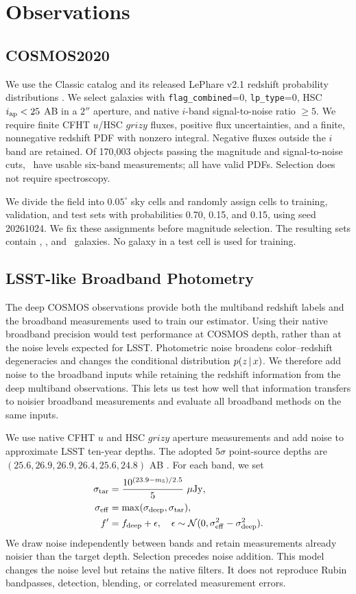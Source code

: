 \section{Observations}\label{sec:observations}
\subsection{COSMOS2020}
We use the \cosmos Classic catalog and its released LePhare v2.1 redshift
probability distributions \citep{weaver2022,ilbert2006}. We select galaxies
with \texttt{flag\_combined}=0, \texttt{lp\_type}=0, HSC $i_{\rm ap}<25$ AB
in a $2''$ aperture, and native $i$-band signal-to-noise ratio $\geq5$.
We require finite CFHT $u$/HSC $grizy$ fluxes, positive flux uncertainties,
and a finite, nonnegative redshift PDF with nonzero integral. Negative fluxes
outside the $i$ band are retained. Of 170,003 objects passing the magnitude
and signal-to-noise cuts, \NParent\ have usable six-band measurements;
all have valid PDFs. Selection does not require spectroscopy.

We divide the field into $0.05^\circ$ sky cells and randomly assign cells
to training, validation, and test sets with probabilities 0.70, 0.15, and
0.15, using seed 20261024. We fix these assignments before magnitude
selection. The resulting sets contain \NTrain, \NValidation, and
\NPhotTest\ galaxies. No galaxy in a test cell is used for training.

\subsection{LSST-like Broadband Photometry}
The deep COSMOS observations provide both the multiband redshift labels and
the broadband measurements used to train our estimator. Using their native
broadband precision would test performance at COSMOS depth, rather than at
the noise levels expected for LSST. Photometric noise broadens color--redshift
degeneracies and changes the conditional distribution $p(z\,|\, x)$.
We therefore add noise to the broadband inputs while retaining the redshift
information from the deep multiband observations. This lets us test how well
that information transfers to noisier broadband measurements and evaluate
all broadband methods on the same inputs.

We use native CFHT $u$ and HSC $grizy$ aperture measurements and add noise
to approximate LSST ten-year depths. The adopted $5\sigma$ point-source
depths are $(25.6,26.9,26.9,26.4,25.6,24.8)$ AB \citep{rubindepths}.
For each band, we set
\begin{align}
\sigma_{\rm tar}&=\frac{10^{(23.9-m_5)/2.5}}{5}\ \mu{\rm Jy},\\
\sigma_{\rm eff}&=\max(\sigma_{\rm deep},\sigma_{\rm tar}),\\
f'&=f_{\rm deep}+\epsilon,\quad
\epsilon\sim\mathcal N(0,\sigma_{\rm eff}^2-\sigma_{\rm deep}^2).
\label{eq:kernel}
\end{align}
We draw noise independently between bands and retain measurements already
noisier than the target depth. Selection precedes noise addition.
This model changes the noise level but retains the native filters.
It does not reproduce Rubin bandpasses, detection, blending, or correlated
measurement errors.

